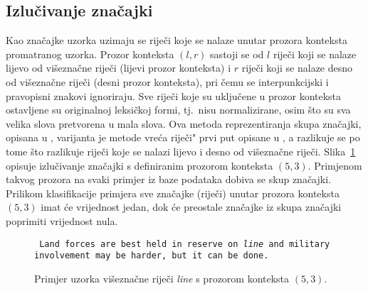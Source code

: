 \documentclass[10pt, a4paper]{article}
\begin{document}
\subsection{Izlučivanje značajki}
Kao značajke uzorka uzimaju se riječi koje se nalaze unutar prozora konteksta promatranog uzorka.
Prozor konteksta $(l,r)$  sastoji se
od $l$ riječi koji se nalaze lijevo od višeznačne riječi (lijevi prozor konteksta) 
i $r$ riječi koji se nalaze desno od višeznačne riječi (desni prozor konteksta), pri čemu se
interpunkcijski i pravopisni znakovi ignoriraju. Sve riječi koje su uključene u prozor konteksta ostavljene su originalnoj leksičkoj formi, tj.~nisu normalizirane, osim što su sva velika
slova pretvorena u mala slova. 
Ova metoda reprezentiranja skupa značajki,
opisana u \citep{pedersen}, varijanta je metode \grqq vreća riječi"  
prvi put opisane u \citep{gale-etc}, a razlikuje se po tome što razlikuje 
riječi koje se nalazi lijevo i desno od višeznačne riječi. \mbox{Slika \ref{window_of_context}}
opisuje izlučivanje značajki s definiranim prozorom konteksta $(5,3)$. Primjenom
takvog prozora na svaki primjer iz baze podataka dobiva se skup značajki. Prilikom
klasifikacije primjera sve značajke (riječi) unutar prozora konteksta $(5,3)$ imat će vrijednost jedan, dok će preostale značajke iz skupa značajki poprimiti vrijednost nula.

\begin{figure}[!hbtp]
{\small \texttt{     Land forces are best held in reserve on  \emph{line}  and military involvement may be harder, but it can be done.}}
\caption{Primjer uzorka višeznačne riječi \emph{line} s prozorom konteksta $(5, 3)$.\label{window_of_context}}
\end{figure}
\end{document}

